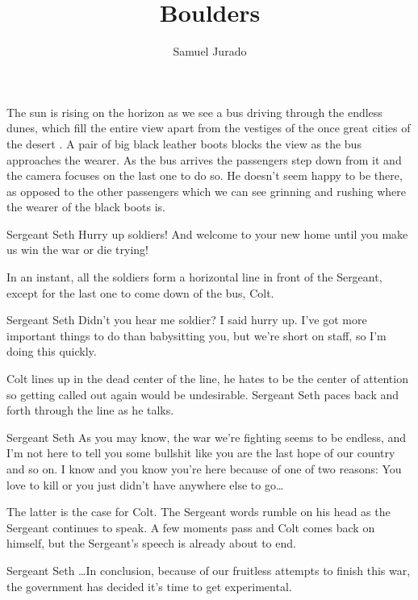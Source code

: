 \documentclass{screenplay}[2012/06/30]
\title{Boulders}
\author{Samuel Jurado}
\begin{document}
\coverpage

\fadein

The sun is rising on the horizon as we see a bus driving
through the endless dunes, which fill the entire view
apart from the vestiges of the once great cities of the
desert . A pair of big black leather
boots blocks the view as the bus approaches the wearer.
As the bus arrives the passengers step
down from it and the camera focuses on the last one to do so.
He doesn't seem happy to be there, as opposed to the
other passengers which we can see grinning and rushing where
the wearer of the black boots is.

\begin{dialogue}[shouting]{Sergeant Seth}
    Hurry up soldiers! And welcome to your new home until you
    make us win the war or die trying!
\end{dialogue}

In an instant, all the soldiers form a horizontal line in front of the
Sergeant, except for the last one to come down of the bus, Colt.

\begin{dialogue}{Sergeant Seth}
    Didn't you hear me soldier? I said hurry up. I've got
    more important things to do than babysitting you, but we're
    short on staff, so I'm doing this quickly.
\end{dialogue}

Colt lines up in the dead center of the line, he hates to
be the center of attention so getting called out again would
be undesirable. Sergeant Seth paces back and forth through the line as he
talks.

\begin{dialogue}{Sergeant Seth}
    As you may know, the war we're fighting seems to be
    endless, and I'm not here to tell you some bullshit
    like you are the last hope of our country and so on. I know
    and you know you're here because of one of two reasons:
    You love to kill or you just didn't have anywhere else
    to go\dots
\end{dialogue}

The latter is the case for Colt. The Sergeant words rumble on
his head as the Sergeant continues to speak. A few moments
pass and Colt comes back on himself, but the Sergeant's speech
is already about to end.

\begin{dialogue}{Sergeant Seth}
    \dots In conclusion, because of our fruitless attempts
    to finish this war, the government has decided it's time
    to get experimental.
\end{dialogue}
\end{document}
